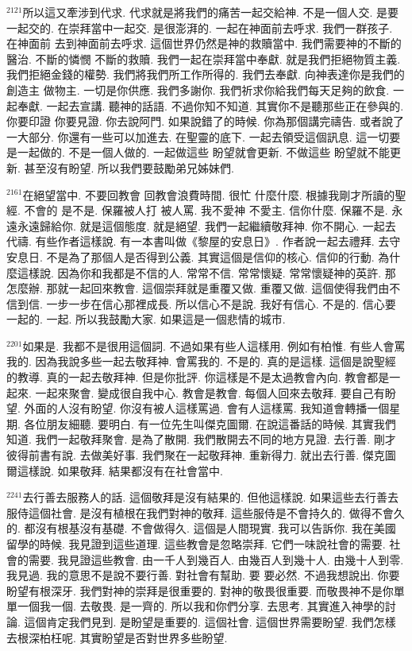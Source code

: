 \documentclass{book}
\begin{document}
$^{2121}$所以這又牽涉到代求.
代求就是將我們的痛苦一起交給神.
不是一個人交.
是要一起交的.
在崇拜當中一起交.
是很澎湃的.
一起在神面前去呼求.
我們一群孩子.
在神面前 去到神面前去呼求.
這個世界仍然是神的救贖當中.
我們需要神的不斷的醫治.
不斷的憐憫 不斷的救贖.
我們一起在崇拜當中奉獻.
就是我們拒絕物質主義.
我們拒絕金錢的權勢.
我們將我們所工作所得的.
我們去奉獻.
向神表達你是我們的創造主 做物主.
一切是你供應.
我們多謝你.
我們祈求你給我們每天足夠的飲食.
一起奉獻.
一起去宣講.
聽神的話語.
不過你知不知道.
其實你不是聽那些正在參與的.
你要印證 你要見證.
你去說阿門.
如果說錯了的時候.
你為那個講完禱告.
或者說了一大部分.
你還有一些可以加進去.
在聖靈的底下.
一起去領受這個訊息.
這一切要是一起做的.
不是一個人做的.
一起做這些 盼望就會更新.
不做這些 盼望就不能更新.
甚至沒有盼望.
所以我們要鼓勵弟兄姊妹們.

$^{2161}$在絕望當中.
不要回教會 回教會浪費時間.
很忙 什麼什麼.
根據我剛才所讀的聖經.
不會的 是不是.
保羅被人打 被人罵.
我不愛神 不愛主.
信你什麼.
保羅不是.
永遠永遠歸給你.
就是這個態度.
就是絕望.
我們一起繼續敬拜神.
你不開心.
一起去代禱.
有些作者這樣說.
有一本書叫做《黎屋的安息日》.
作者說一起去禮拜.
去守安息日.
不是為了那個人是否得到公義.
其實這個是信仰的核心.
信仰的行動.
為什麼這樣說.
因為你和我都是不信的人.
常常不信.
常常懷疑.
常常懷疑神的英許.
那怎麼辦.
那就一起回來教會.
這個崇拜就是重覆又做.
重覆又做.
這個使得我們由不信到信.
一步一步在信心那裡成長.
所以信心不是說.
我好有信心.
不是的.
信心要一起的.
一起.
所以我鼓勵大家.
如果這是一個悲情的城市.

$^{2201}$如果是.
我都不是很用這個詞.
不過如果有些人這樣用.
例如有柏惟.
有些人會罵我的.
因為我說多些一起去敬拜神.
會罵我的.
不是的.
真的是這樣.
這個是說聖經的教導.
真的一起去敬拜神.
但是你批評.
你這樣是不是太過教會內向.
教會都是一起來.
一起來聚會.
變成很自我中心.
教會是教會.
每個人回來去敬拜.
要自己有盼望.
外面的人沒有盼望.
你沒有被人這樣罵過.
會有人這樣罵.
我知道會轉播一個星期.
各位朋友細聽.
要明白.
有一位先生叫傑克圖爾.
在說這番話的時候.
其實我們知道.
我們一起敬拜聚會.
是為了散開.
我們散開去不同的地方見證.
去行善.
剛才彼得前書有說.
去做美好事.
我們聚在一起敬拜神.
重新得力.
就出去行善.
傑克圖爾這樣說.
如果敬拜.
結果都沒有在社會當中.

$^{2241}$去行善去服務人的話.
這個敬拜是沒有結果的.
但他這樣說.
如果這些去行善去服侍這個社會.
是沒有植根在我們對神的敬拜.
這些服侍是不會持久的.
做得不會久的.
都沒有根基沒有基礎.
不會做得久.
這個是人間現實.
我可以告訴你.
我在美國留學的時候.
我見證到這些道理.
這些教會是忽略崇拜.
它們一味說社會的需要.
社會的需要.
我見證這些教會.
由一千人到幾百人.
由幾百人到幾十人.
由幾十人到零.
我見過.
我的意思不是說不要行善.
對社會有幫助.
要 要必然.
不過我想說出.
你要盼望有根深牙.
我們對神的崇拜是很重要的.
對神的敬畏很重要.
而敬畏神不是你單單一個我一個.
去敬畏.
是一齊的.
所以我和你們分享.
去思考.
其實進入神學的討論.
這個肯定我們見到.
是盼望是重要的.
這個社會.
這個世界需要盼望.
我們怎樣去根深柏枉呢.
其實盼望是否對世界多些盼望.
\end{document}
